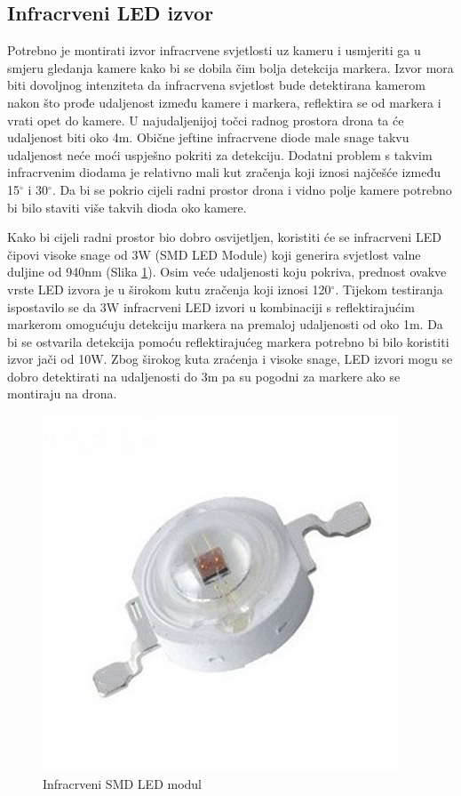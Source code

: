 \documentclass[times, utf8, diplomski]{fer}
\begin{document}
\subsection{Infracrveni LED izvor}
Potrebno je montirati izvor infracrvene svjetlosti uz kameru i usmjeriti ga u smjeru gledanja kamere kako bi se dobila čim bolja detekcija markera. Izvor mora biti dovoljnog intenziteta da infracrvena svjetlost bude detektirana kamerom nakon što prođe udaljenost između kamere i markera, reflektira se od markera i vrati opet do kamere. U najudaljenijoj točci radnog prostora drona ta će udaljenost biti oko 4m. Obične jeftine infracrvene diode male snage takvu udaljenost neće moći uspješno pokriti za detekciju. Dodatni problem s takvim infracrvenim diodama je relativno mali kut zračenja koji iznosi najčešće između 15$^{\circ}$ i 30$^{\circ}$. Da bi se pokrio cijeli radni prostor drona i vidno polje kamere potrebno bi bilo staviti više takvih dioda oko kamere.

Kako bi cijeli radni prostor bio dobro osvijetljen, koristiti će se infracrveni LED čipovi visoke snage od 3W (SMD LED Module) koji generira svjetlost valne duljine od 940nm (Slika \ref{fig:led}). Osim veće udaljenosti koju pokriva, prednost ovakve vrste LED izvora je u širokom kutu zračenja koji iznosi 120$^{\circ}$. Tijekom testiranja ispostavilo se da 3W infracrveni LED izvori u kombinaciji s reflektirajućim markerom omogućuju detekciju markera na premaloj udaljenosti od oko 1m. Da bi se ostvarila detekcija pomoću reflektirajućeg markera potrebno bi bilo koristiti izvor jači od 10W. Zbog širokog kuta zraćenja i visoke snage, LED izvori mogu se dobro detektirati na udaljenosti do 3m pa su pogodni za markere ako se montiraju na drona.

\begin{figure}[h]
\centering
\includegraphics[width=.4\textwidth]{infrared_led}
\caption{Infracrveni SMD LED modul \protect\footnotemark}
\label{fig:led}
\end{figure}
\end{document}
